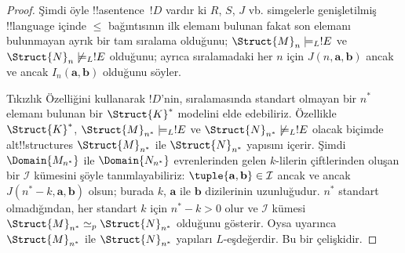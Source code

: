 \documentclass[../../../include/open-logic-section]{subfiles}
\begin{document}
\begin{proof}
Şimdi öyle !!a{sentence}~$!D$ vardır ki $R$, $S$, $J$ vb. simgelerle
genişletilmiş !!{language} içinde $\leq$ bağıntısının ilk elemanı bulunan fakat
son elemanı bulunmayan ayrık bir tam sıralama olduğunu;
$\Struct{M}_n\models_L !E$ ve $\Struct{N}_n\not\models_L !E$ olduğunu; ayrıca
sıralamadaki her $n$ için $J(n,\mathbf a,\mathbf b)$ ancak ve ancak
$I_n(\mathbf a,\mathbf b)$ olduğunu söyler.

Tıkızlık Özelliğini kullanarak $!D$'nin, sıralamasında standart olmayan bir
$n^*$ elemanı bulunan bir $\Struct{K}^*$ modelini elde edebiliriz. Özellikle
$\Struct{K}^*$, $\Struct{M}_{n^*}\models_L !E$ ve
$\Struct{N}_{n^*}\not\models_L !E$ olacak biçimde alt!!{structure}s
$\Struct{M}_{n^*}$ ile $\Struct{N}_{n^*}$ yapısını içerir. Şimdi
$\Domain{M_{n^*}}$ ile $\Domain{N_{n^*}}$ evrenlerinden gelen $k$-lilerin
çiftlerinden oluşan bir $\mathcal I$ kümesini şöyle tanımlayabiliriz:
$\tuple{\mathbf a,\mathbf b}\in\mathcal I$ ancak ve ancak
$J(n^*-k,\mathbf a,\mathbf b)$ olsun; burada $k$, $\mathbf a$ ile
$\mathbf b$ dizilerinin uzunluğudur. $n^*$ standart olmadığından, her
standart $k$ için $n^*-k>0$ olur ve $\mathcal I$ kümesi
$\Struct{M}_{n^*}\simeq_p\Struct{N}_{n^*}$ olduğunu gösterir. Oysa
 uyarınca $\Struct{M}_{n^*}$ ile
$\Struct{N}_{n^*}$ yapıları $L$-eşdeğerdir. Bu bir çelişkidir.
\end{proof}
\end{document}
